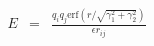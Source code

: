 \documentclass[12pt]{article}
\begin{document}
  \thispagestyle{empty}
\begin{eqnarray*}
  E &=& \frac{q_i q_j \mathrm{erf}\left( r/\sqrt{\gamma_1^2+\gamma_2^2} \right) }{\epsilon r_{ij}}
\end{eqnarray*}
\end{document}
